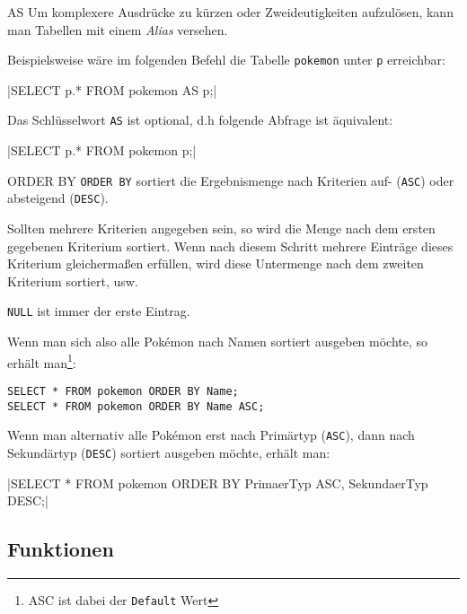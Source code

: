 \begin{sql}{AS}
    Um komplexere Ausdrücke zu kürzen oder Zweideutigkeiten aufzulösen, kann man Tabellen mit einem \emph{Alias} versehen.

    Beispielsweise wäre im folgenden Befehl die Tabelle \texttt{pokemon} unter \texttt{p} erreichbar:

    |SELECT p.* FROM pokemon AS p;|

    Das Schlüsselwort \texttt{AS} ist optional, d.h folgende Abfrage ist äquivalent:
    
    |SELECT p.* FROM pokemon p;|
\end{sql}

\begin{sql}{ORDER BY}
    \texttt{ORDER BY} sortiert die Ergebnismenge nach Kriterien auf- (\texttt{ASC}) oder absteigend (\texttt{DESC}).
    
    Sollten mehrere Kriterien angegeben sein, so wird die Menge nach dem ersten gegebenen Kriterium sortiert.
    Wenn nach diesem Schritt mehrere Einträge dieses Kriterium gleichermaßen erfüllen, wird diese Untermenge nach dem zweiten Kriterium sortiert, usw.

    \texttt{NULL} ist immer der erste Eintrag.
    
    Wenn man sich also alle Pokémon nach Namen sortiert ausgeben möchte, so erhält man\footnote{ASC ist dabei der \texttt{Default} Wert}:

    \begin{verbatim}
SELECT * FROM pokemon ORDER BY Name;
SELECT * FROM pokemon ORDER BY Name ASC;
    \end{verbatim}

    

    Wenn man alternativ alle Pokémon erst nach Primärtyp (\texttt{ASC}), dann nach Sekundärtyp (\texttt{DESC}) sortiert ausgeben möchte, erhält man:

    |SELECT * FROM pokemon ORDER BY PrimaerTyp ASC, SekundaerTyp DESC;|

    
\end{sql}

\subsection{Funktionen}

